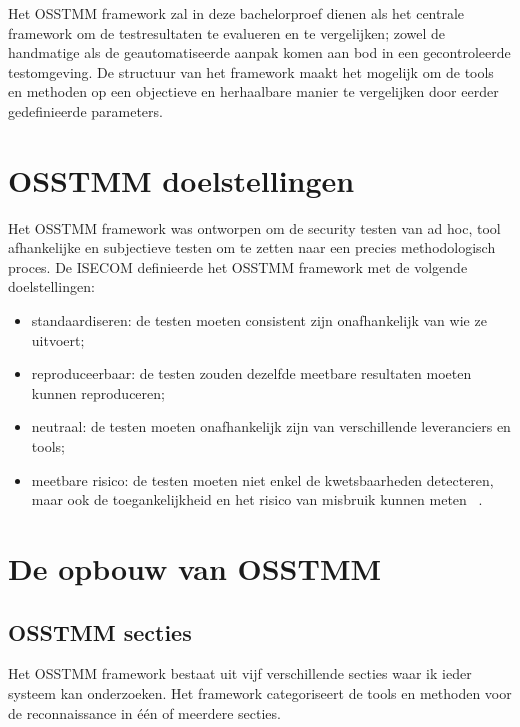 Het OSSTMM framework zal in deze bachelorproef dienen als het centrale framework om de testresultaten te evalueren en te vergelijken; zowel de handmatige als de geautomatiseerde aanpak komen aan bod in een gecontroleerde testomgeving.
De structuur van het framework maakt het mogelijk om de tools en methoden op een objectieve en herhaalbare manier te vergelijken door eerder gedefinieerde parameters.

\section{OSSTMM doelstellingen}
Het OSSTMM framework was ontworpen om de security testen van ad hoc, tool afhankelijke en subjectieve testen om te zetten naar een precies methodologisch proces.
De ISECOM definieerde het OSSTMM framework met de volgende doelstellingen:

\begin{itemize}
  \item standaardiseren: de testen moeten consistent zijn onafhankelijk van wie ze uitvoert;
  \item reproduceerbaar: de testen zouden dezelfde meetbare resultaten moeten kunnen reproduceren;
  \item neutraal: de testen moeten onafhankelijk zijn van verschillende leveranciers en tools;
  \item meetbare risico: de testen moeten niet enkel de kwetsbaarheden detecteren, maar ook de toegankelijkheid en het risico van misbruik kunnen meten ~\autocite{Herzog}.
\end{itemize}

\section{De opbouw van OSSTMM}

\subsection{OSSTMM secties}
Het OSSTMM framework bestaat uit vijf verschillende secties waar ik ieder systeem kan onderzoeken.
Het framework categoriseert de tools en methoden voor de reconnaissance in één of meerdere secties.

